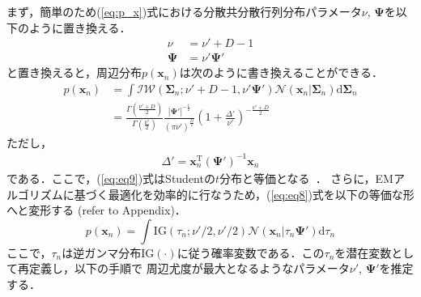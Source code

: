\documentclass[journal]{IEEEtran}
\begin{document}
まず，簡単のため(\ref{eq:p_x})式における分散共分散行列分布パラメータ$\nu$, $\mathbf{\Psi}$を以下のように置き換える．
\begin{align}
	\label{eq:eq6}
	\nu&= \nu' + D - 1 \\
	\label{eq:eq7}
	\mathbf{\Psi}&= \nu' \mathbf{\Psi}'
\end{align}
と置き換えると，周辺分布$p(\mathbf{x}_n)$は次のように書き換えることができる．
\begin{align}%
\label{eq:eq8}
p(\mathbf{x}_n) &=\int \mathcal{IW}(\bm{\Sigma}_n; \nu'+D-1, \nu' \bm{\Psi}') \mathcal{N}(\mathbf{x}_n|\bm{\Sigma}_n) \mathrm{d} {\bm{\Sigma}_n} \\
\label{eq:eq9}
&=\frac{\Gamma(\frac{\nu'+D}{2})}{\Gamma(\frac{\nu'}{2})} \frac{|{\bm \Psi'}|^{-\frac{1}{2}}}{\left(\pi \nu' \right)^{\frac{D}{2}}} \left(1+\frac{\Delta '}{\nu '} \right)^{-\frac{\nu'+D}{2}}
\end{align}
ただし，
\begin{eqnarray}
	\Delta ' = \mathbf{x}_n^\mathrm{T} ({\bm \Psi '})^{-1} \mathbf{x}_n
\end{eqnarray}
である．ここで，(\ref{eq:eq9})式はStudentの$t$分布と等価となる~\cite{t2006}．
さらに，EMアルゴリズムに基づく最適化を効率的に行なうため，(\ref{eq:eq8})式を以下の等価な形へと変形する (refer to Appendix)．
\begin{equation}%
\label{eq:eq11}
		p(\mathbf{x}_n) = \int \mathrm{IG}(\tau_n;\nu'/2,\nu'/2) \mathcal{N}(\mathbf{x}_n|\tau_n \mathbf{\Psi}') \mathrm{d}{\tau_n}
\end{equation}
ここで，$\tau_n$は逆ガンマ分布$\mathrm{IG}(\cdot)$に従う確率変数である．この$\tau_n$を潜在変数として再定義し，以下の手順で
周辺尤度が最大となるようなパラメータ$\nu'$, ${\bm \Psi'}$を推定する．
\end{document}
